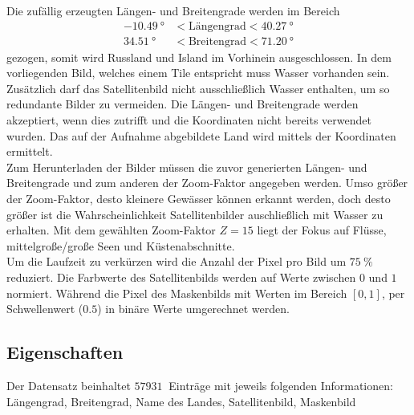 Die zufällig erzeugten Längen- und Breitengrade werden im Bereich
\begin{align*}
    \SI{-10.49}{\degree} &< \text{Längengrad} < \SI{40.27}{\degree} \\
    \SI{34.51}{\degree} &< \text{Breitengrad} < \SI{71.20}{\degree}
\end{align*}
gezogen, somit wird Russland und Island im Vorhinein ausgeschlossen.
In dem vorliegenden Bild, welches einem Tile entspricht muss Wasser vorhanden sein.
Zusätzlich darf das Satellitenbild nicht ausschließlich Wasser enthalten, um so redundante Bilder zu vermeiden.
Die Längen- und Breitengrade werden akzeptiert, wenn dies zutrifft und die Koordinaten nicht bereits verwendet wurden.
Das auf der Aufnahme abgebildete Land wird mittels der Koordinaten ermittelt.
\\
Zum Herunterladen der Bilder müssen die zuvor generierten Längen- und Breitengrade und zum anderen der Zoom-Faktor angegeben werden.
Umso größer der Zoom-Faktor, desto kleinere Gewässer können erkannt werden, doch desto größer ist die Wahrscheinlichkeit Satellitenbilder auschließlich mit Wasser zu erhalten.
Mit dem gewählten Zoom-Faktor $Z = 15$ liegt der Fokus auf Flüsse, mittelgroße/große Seen und Küstenabschnitte.
\\
Um die Laufzeit zu verkürzen wird die Anzahl der Pixel pro Bild um $\SI{75}{\percent}$ reduziert.
Die Farbwerte des Satellitenbilds werden auf Werte zwischen $0$ und $1$ normiert.
Während die Pixel des Maskenbilds mit Werten im Bereich $[0, 1]$, per Schwellenwert ($0.5$) in binäre Werte umgerechnet werden.

\subsection{Eigenschaften}
Der Datensatz beinhaltet $\SI{57931}{}$ Einträge mit jeweils folgenden Informationen:
\\
Längengrad, Breitengrad, Name des Landes, Satellitenbild, Maskenbild
\\

